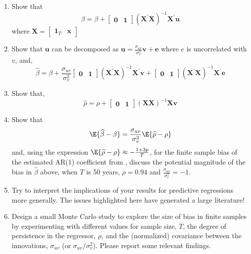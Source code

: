 \begin{enumerate}[label = (\alph*)]
    \item  Show that 
    \[
        \widehat\beta = \beta + \begin{bmatrix}
            \mathbf{0} & \mathbf{1} 
        \end{bmatrix}(\mathbf{X}^\prime \mathbf{X})^{-1}\mathbf{X}^\prime \mathbf{u}
    \]
    where \(\mathbf{X} = \begin{bmatrix} \mathbf{1}_T & \mathbf x \end{bmatrix}\)
    \item Show that \(\mathbf{u}\) can be decomposed as \(\mathbf{u} = \frac{\sigma_{uv}}{\sigma_v^2}\mathbf v + \mathbf e\) where \(e\) is uncorrelated with \(v\), and,
    \[
        \widehat \beta = \beta + \frac{\sigma_{uv}}{\sigma_v^2}\begin{bmatrix}
            \mathbf{0} & \mathbf{1}
        \end{bmatrix}\left(\mathbf{X}^\prime \mathbf{X}\right)^{-1}\mathbf{X}^\prime \mathbf{v} + \begin{bmatrix}
            \mathbf{0} & \mathbf{1}
        \end{bmatrix}\left(\mathbf{X}^\prime \mathbf{X}\right)^{-1}\mathbf{X}^\prime \mathbf{e}
    \]
    \item Show that,
    \[
        \widehat \rho = \rho + \begin{bmatrix}
            \mathbf{0} & \mathbf{1}
        \end{bmatrix}\left(\mathbf{X} \mathbf{X}\right)^{-1}\mathbf{X} \mathbf{v}
    \]
    \item Show that
    \[
        \E{\widehat\beta-\beta} = \frac{\sigma_{uv}}{\sigma_v^2} \E{\widehat\rho - \rho}
    \]
    and, using the expression \(\E{\widehat\rho-\rho}\approx -\frac{1+3p}{T}\), for the finite sample bias of the estimated AR(1) coefficient from \citet{kendall1954note}, discuss the potential magnitude of the bias in \(\widehat\beta\) above, when \(T\) is 50 years, \(\rho = 0.94\) and \(\frac{\sigma_{uv}}{\sigma_v^2} = -1\).
    \item Try to interpret the implications of your results for predictive regressions more generally. The issues highlighted here have generated a large literature!
    \item Design a small Monte Carlo study to explore the size of bias in finite samples by experimenting with different values for sample size, \(T\), the degree of persistence in the regressor, \(\rho\), and the (normalized) covariance between the innovations, \(\sigma_{uv}\) (or \(\sigma_{uv}/\sigma_v^2\)). Please report some relevant findings.
\end{enumerate}